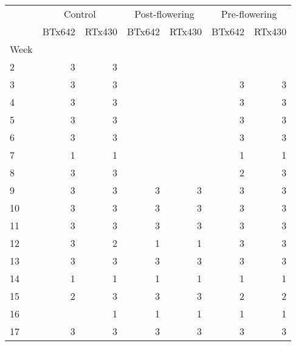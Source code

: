 \begin{tabular}{lrrrrrr}
\toprule
{} & \multicolumn{2}{c}{Control} & \multicolumn{2}{c}{Post-flowering} & \multicolumn{2}{c}{Pre-flowering} \\
{} &  BTx642 & RTx430 &         BTx642 & RTx430 &        BTx642 & RTx430 \\
Week &         &        &                &        &               &        \\
\midrule
2    &       3 &      3 &                &        &               &        \\
3    &       3 &      3 &                &        &             3 &      3 \\
4    &       3 &      3 &                &        &             3 &      3 \\
5    &       3 &      3 &                &        &             3 &      3 \\
6    &       3 &      3 &                &        &             3 &      3 \\
7    &       1 &      1 &                &        &             1 &      1 \\
8    &       3 &      3 &                &        &             2 &      3 \\
9    &       3 &      3 &              3 &      3 &             3 &      3 \\
10   &       3 &      3 &              3 &      3 &             3 &      3 \\
11   &       3 &      3 &              3 &      3 &             3 &      3 \\
12   &       3 &      2 &              1 &      1 &             3 &      3 \\
13   &       3 &      3 &              3 &      3 &             3 &      3 \\
14   &       1 &      1 &              1 &      1 &             1 &      1 \\
15   &       2 &      3 &              3 &      3 &             2 &      2 \\
16   &         &      1 &              1 &      1 &             1 &      1 \\
17   &       3 &      3 &              3 &      3 &             3 &      3 \\
\bottomrule
\end{tabular}
